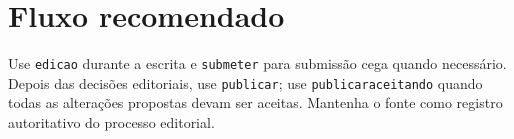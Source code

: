 \documentclass[11pt]{article}
\newcommand{\opt}[1]{\texttt{#1}}
\begin{document}
\section*{Fluxo recomendado}

Use \opt{edicao} durante a escrita e \opt{submeter} para submissão cega quando necessário. Depois das decisões editoriais, use \opt{publicar}; use \opt{publicaraceitando} quando todas as alterações propostas devam ser aceitas. Mantenha o fonte como registro autoritativo do processo editorial.
\end{document}
